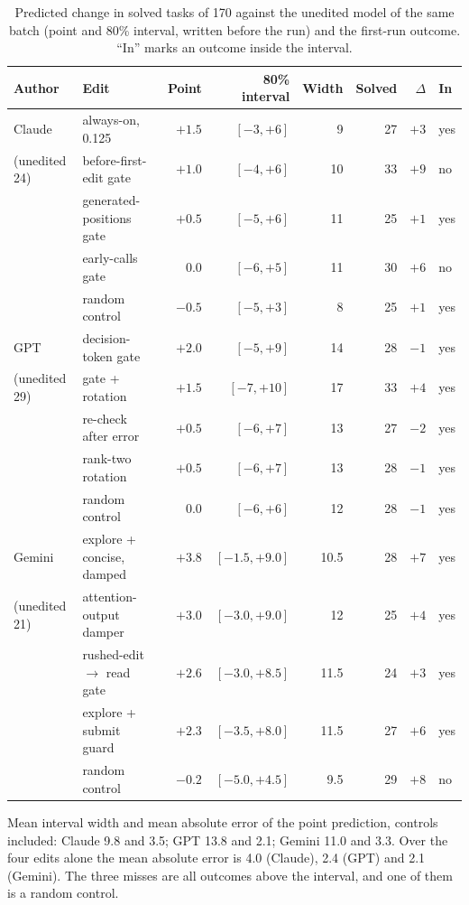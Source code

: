 \begin{table}[h]
\caption{Predicted change in solved tasks of 170 against the unedited model of the same batch (point and 80\% interval, written before the run) and the first-run outcome. ``In'' marks an outcome inside the interval.}
\label{tab:calib}
\centering
\footnotesize
\begin{tabular}{llrrrrrl}
\toprule
Author & Edit & Point & 80\% interval & Width & Solved & $\Delta$ & In \\
\midrule
Claude & always-on, 0.125 & $+1.5$ & $[-3, +6]$ & 9 & 27 & $+3$ & yes \\
(unedited 24) & before-first-edit gate & $+1.0$ & $[-4, +6]$ & 10 & 33 & $+9$ & no \\
 & generated-positions gate & $+0.5$ & $[-5, +6]$ & 11 & 25 & $+1$ & yes \\
 & early-calls gate & $0.0$ & $[-6, +5]$ & 11 & 30 & $+6$ & no \\
 & random control & $-0.5$ & $[-5, +3]$ & 8 & 25 & $+1$ & yes \\
\midrule
GPT & decision-token gate & $+2.0$ & $[-5, +9]$ & 14 & 28 & $-1$ & yes \\
(unedited 29) & gate + rotation & $+1.5$ & $[-7, +10]$ & 17 & 33 & $+4$ & yes \\
 & re-check after error & $+0.5$ & $[-6, +7]$ & 13 & 27 & $-2$ & yes \\
 & rank-two rotation & $+0.5$ & $[-6, +7]$ & 13 & 28 & $-1$ & yes \\
 & random control & $0.0$ & $[-6, +6]$ & 12 & 28 & $-1$ & yes \\
\midrule
Gemini & explore + concise, damped & $+3.8$ & $[-1.5, +9.0]$ & 10.5 & 28 & $+7$ & yes \\
(unedited 21) & attention-output damper & $+3.0$ & $[-3.0, +9.0]$ & 12 & 25 & $+4$ & yes \\
 & rushed-edit $\rightarrow$ read gate & $+2.6$ & $[-3.0, +8.5]$ & 11.5 & 24 & $+3$ & yes \\
 & explore + submit guard & $+2.3$ & $[-3.5, +8.0]$ & 11.5 & 27 & $+6$ & yes \\
 & random control & $-0.2$ & $[-5.0, +4.5]$ & 9.5 & 29 & $+8$ & no \\
\bottomrule
\end{tabular}
\end{table}

Mean interval width and mean absolute error of the point prediction, controls included: Claude 9.8 and 3.5; GPT 13.8 and 2.1; Gemini 11.0 and 3.3. Over the four edits alone the mean absolute error is 4.0 (Claude), 2.4 (GPT) and 2.1 (Gemini). The three misses are all outcomes above the interval, and one of them is a random control.


